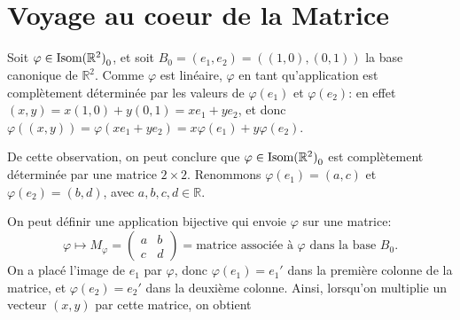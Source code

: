 \documentclass{book}
\numberwithin{equation}{section}
\renewcommand{\phi}{\varphi}
\providecommand{\plan}{{\mathbb R^2}}
\providecommand{\isom}{{\textnormal{Isom}(\plan)}}
\providecommand{\isomo}{{\isom_0}}
\begin{document}
\section{Voyage au coeur de la Matrice}
Soit $\phi \in \isomo$, et soit $B_0 = (e_1, e_2) = ((1, 0), (0, 1))$ la base canonique de $\plan$. Comme $\phi$ est linéaire, $\phi$ en tant qu'application est complètement déterminée par les valeurs de $\phi(e_1)$ et $\phi(e_2)$: en effet $(x, y) = x(1, 0) + y(0, 1) = xe_1 + ye_2$, et donc $\phi((x, y)) = \phi(xe_1 + ye_2) = x\phi(e_1) + y\phi(e_2)$.\par
De cette observation, on peut conclure que $\phi \in \isomo$ est complètement déterminée par une matrice $2 \times 2$. Renommons $\phi(e_1) = (a, c)$ et $\phi(e_2) = (b, d)$, avec $a, b, c, d \in \mathbb R$.\par
On peut définir une application bijective qui envoie $\phi$ sur une matrice:
\begin{equation*}
	\phi \mapsto M_\phi = \begin{pmatrix}
		a & b\\
		c & d
	\end{pmatrix}
	= \text{matrice associée à $\phi$ dans la base $B_0$}.
\end{equation*}
On a placé l'image de $e_1$ par $\phi$, donc $\phi(e_1) = e_1'$ dans la première colonne de la matrice, et $\phi(e_2) = e_2'$ dans la deuxième colonne. Ainsi, lorsqu'on multiplie un vecteur $(x, y)$ par cette matrice, on obtient
\end{document}
